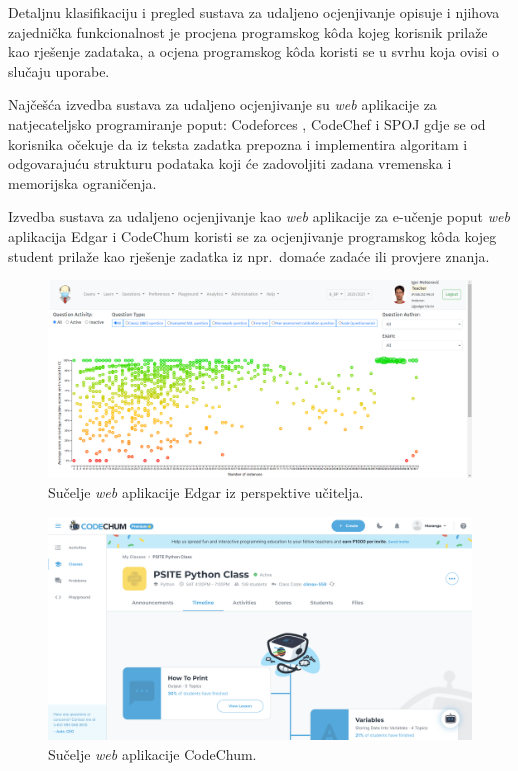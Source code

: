 \documentclass[times, utf8, diplomski]{fer}
\begin{document}
Detaljnu klasifikaciju i pregled sustava za udaljeno ocjenjivanje opisuje \citep{wasik2018survey} i njihova zajednička funkcionalnost je procjena  programskog kôda kojeg korisnik prilaže kao rješenje zadataka, a ocjena  programskog kôda koristi se u svrhu koja ovisi o slučaju uporabe.

Najčešća izvedba sustava za udaljeno ocjenjivanje su \textit{web} aplikacije za natjecateljsko programiranje poput: Codeforces \citep{Codeforces}, CodeChef \citep{CodeChef} i SPOJ \citep{SPOJ} gdje se od korisnika očekuje da iz teksta zadatka prepozna i implementira algoritam i odgovarajuću strukturu podataka koji će zadovoljiti zadana vremenska i memorijska ograničenja. 

Izvedba sustava za udaljeno ocjenjivanje kao \textit{web} aplikacije za e-učenje poput \textit{web} aplikacija Edgar \citep{mekterovic2020building} i CodeChum \citep{maranga2019codechum} koristi se za ocjenjivanje  programskog kôda kojeg student prilaže kao rješenje zadatka iz npr.\ domaće zadaće ili provjere znanja.

\begin{figure}[htb]
	\centering
	\includegraphics[width=\textwidth]{images/edgar-ui.png}
	\caption{
		Sučelje \textit{web} aplikacije Edgar iz perspektive učitelja.
	}
	\label{fig:edgar-ui}
\end{figure}

\begin{figure}[htb]
	\centering
	\includegraphics[width=\textwidth]{images/codechum-ui.png}
	\caption{
		Sučelje \textit{web} aplikacije CodeChum.
	}
	\label{fig:codechum-ui}
\end{figure}
\end{document}
